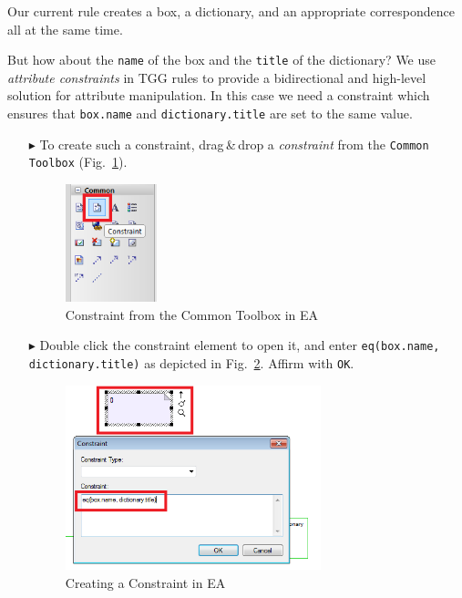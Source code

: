 Our current rule creates a box, a dictionary, and an appropriate correspondence all at the same time.

But how about the \texttt{name} of the box and the \texttt{title} of the dictionary? 
We use \emph{attribute constraints} in TGG rules to provide a bidirectional and high-level solution for attribute manipulation.
In this case we need a constraint which ensures that \texttt{box.name} and \texttt{dictionary.title} are set to the same value.

\begin{enumerate}
\item[$\blacktriangleright$] To create such a constraint, drag\,\&\,drop a \emph{constraint} from the \texttt{Common Toolbox} (Fig.~\ref{fig:common_toolbox}).

\begin{figure}[htbp]
\begin{center}
  \includegraphics[width=0.25\textwidth]{pics/tggBilder/tggRule/tgg12}
  \caption{Constraint from the Common Toolbox in EA}  
  \label{fig:common_toolbox}
\end{center}
\end{figure}

\item[$\blacktriangleright$] Double click the constraint element to open it, and enter \texttt{eq(box.name, dictionary.title)} as depicted in Fig.~\ref{fig:first_tgg_constraint}. 
Affirm with \texttt{OK}.

\begin{figure}[htbp]
\begin{center}
  \includegraphics[width=0.7\textwidth]{pics/tggBilder/tggRule/tgg13}
  \caption{Creating a Constraint in EA}  
  \label{fig:first_tgg_constraint}
\end{center}
\end{figure}


\end{enumerate}

